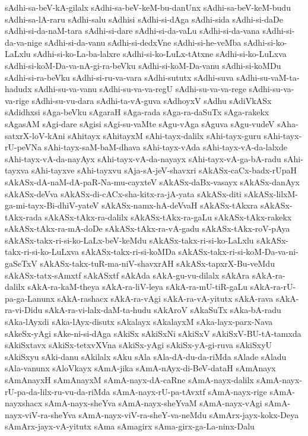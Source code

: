 {sAdhi-sa-beV-kA-gilalx
sAdhi-sa-beV-keM-bu-danUnx
sAdhi-sa-beV-keM-budu
sAdhi-sa-lA-raru
sAdhi-salu
sAdhisi
sAdhi-si-dAga
sAdhi-sida
sAdhi-si-daDe
sAdhi-si-da-naM-tara
sAdhi-si-dare
sAdhi-si-da-vaLu
sAdhi-si-da-vana
sAdhi-si-da-va-nige
sAdhi-si-da-vanu
sAdhi-si-dedxVne
sAdhi-si-he-veMba
sAdhi-si-ko-LaLxlu
sAdhi-si-ko-La-ba-lalxre
sAdhi-si-ko-LuLx-tAtxne
sAdhi-si-ko-LuLxva
sAdhi-si-koM-Da-va-nA-gi-ra-beVku
sAdhi-si-koM-Da-vanu
sAdhi-si-koMDu
sAdhi-si-ra-beVku
sAdhi-si-ru-va-vara
sAdhi-sututx
sAdhi-suva
sAdhi-su-vaM-ta-hadudx
sAdhi-su-va-vanu
sAdhi-su-va-va-regU
sAdhi-su-va-va-rege
sAdhi-su-va-va-rige
sAdhi-su-vu-dara
sAdhi-ta-vA-guva
sAdhoyxV
sAdhu
sAdiVkASx
sAdidhxsi
sAga-beVku
sAgaraH
sAga-rada
sAga-ra-daSuTx
sAga-rakekx
sAgasAM
sAgi-dare
sAgisi
sAgi-su-vaMte
sAgu-vAga
sAguva
sAgu-vudeV
sAha-satxrX-loV-kAni
sAhitayx
sAhitayxM
sAhi-tayx-dalilx
sAhi-tayx-guru
sAhi-tayx-rU-peVNa
sAhi-tayx-saM-baM-dhava
sAhi-tayx-vAda
sAhi-tayx-vA-da-lalxde
sAhi-tayx-vA-da-nayAyx
sAhi-tayx-vA-da-nayayx
sAhi-tayx-vA-ga-bA-radu
sAhi-tayxva
sAhi-tayxve
sAhi-tayxvu
sAja-sA-jeV-shavxri
sAkASx-caCx-badx-rUpaH
sAkASx-dA-naM-dA-paR-Na-mu-cayxteV
sAkASx-daBx-vasayx
sAkASx-danAyx
sAkASx-deVva
sAkASx-di-cACx-sha-kitx-ra-jA-yata
sAkASx-diti
sAkASx-lilxM-ga-mi-tayx-Bi-dhiV-yateV
sAkASx-namx-hA-deVvaH
sAkASx-tAkxra
sAkASx-tAkx-rada
sAkASx-tAkx-ra-dalilx
sAkASx-tAkx-ra-gaLu
sAkASx-tAkx-rakekx
sAkASx-tAkx-ra-mA-doDe
sAkASx-tAkx-ra-vA-gadu
sAkASx-tAkx-roV-pAya
sAkASx-takx-ri-si-ko-LaLx-beV-keMdu
sAkASx-takx-ri-si-ko-LaLxlu
sAkASx-takx-ri-si-ko-LuLxva
sAkASx-takx-ri-si-koMDa
sAkASx-takx-ri-si-koM-Da-va-ni-gaSeTxV
sAkASx-takx-tuR-ma-niV-shavxrAH
sAkASx-tapxrX-Bu-veMdu
sAkASx-tatx-sAmxtf
sAkASxtf
sAkAda
sAkA-gu-vu-dilalx
sAkAra
sAkA-ra-dalilx
sAkA-ra-kaM-theya
sAkA-ra-liV-leya
sAkA-ra-mU-tiR-gaLu
sAkA-ra-rU-pa-ga-Lanunx
sAkA-rashacx
sAkA-ra-vAgi
sAkA-ra-vA-yitutx
sAkA-rava
sAkA-ra-vi-Didu
sAkA-ra-vi-lalx-daM-ta-hudu
sAkAroV
sAkaSuTx
sAka-bA-radu
sAka-lAyxdi
sAka-lAyx-disutx
sAkalayx
sAkalayxM
sAka-layx-parx-Nava
sAkeSx-yAgi
sAke-ni-si-dAga
sAkiSx
sAkiSxNi
sAkiSxV
sAkiSxV-BU-tA-tamxda
sAkiSxtavx
sAkiSx-tetxvXVna
sAkiSx-yAgi
sAkiSx-yA-gi-ruva
sAkiSxyU
sAkiSxyu
sAki-danu
sAkilalx
sAku
sAla
sAla-dA-du-da-riMda
sAlade
sAladu
sAla-vanunx
sAloVkayx
sAmA-jika
sAmA-nAyx-di-BeV-dataH
sAmAnayx
sAmAnayxH
sAmAnayxM
sAmA-nayx-dA-caRne
sAmA-nayx-dalilx
sAmA-nayx-rU-pa-da-lilx-ru-vu-da-riMda
sAmA-nayx-rU-pa-tAvxtf
sAmA-nayx-rige
sAmA-nayxshacx
sAmA-nayx-sheYva
sAmA-nayx-sheYvaM
sAmA-nayx-vAgi
sAmA-nayx-viV-ra-sheYva
sAmA-nayx-viV-ra-sheY-va-neMdu
sAmArx-jayx-kokx-Deya
sAmArx-jayx-vA-yitutx
sAma
sAmagirx
sAma-girx-ga-La-ninx-Dalu
}
